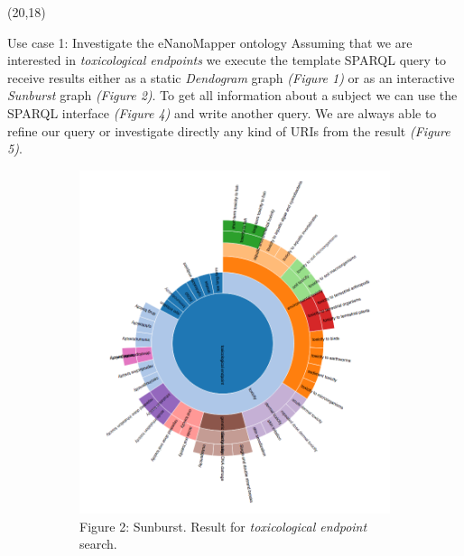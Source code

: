 \documentclass[final]{beamer}
\begin{document}
\begin{frame}{}
    \begin{textblock}{63}(20,18)
      \justifying
      \begin{block}{Use case 1: Investigate the eNanoMapper ontology}
        Assuming that we are interested in \emph{toxicological endpoints} we execute the template SPARQL query to receive results either as a static \emph{Dendogram} graph \emph{(Figure 1)} or as an interactive \emph{Sunburst} graph \emph{(Figure 2)}. To get all information about a subject we can use the SPARQL interface \emph{(Figure 4)} and write another query. We are always able to refine our query or investigate directly any kind of URIs from the result \emph{(Figure 5)}.
        \begin{figure}
          \hspace{-0.1\textwidth}
          \begin{subfigure}[c]{0.35\textwidth}
            \includegraphics[scale=0.75,keepaspectratio]{onto-use-case-1a.png}
            \caption{Figure 2: Sunburst. Result for \emph{toxicological endpoint} search.}
          \end{subfigure}
          \hspace{0.15\textwidth}
          \begin{subfigure}[c]{0.35\textwidth}

\end{subfigure}
\end{figure}
\end{block}
\end{textblock}
\end{frame}
\end{document}
